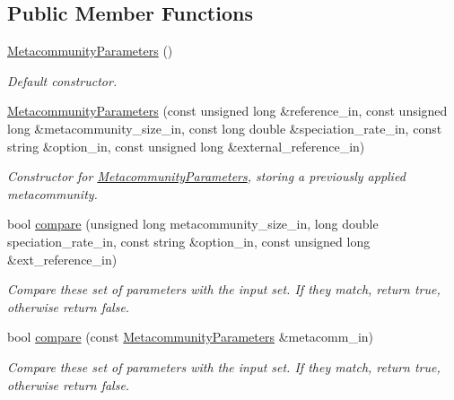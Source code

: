 \subsection*{Public Member Functions}
\begin{DoxyCompactItemize}
\item 
\hyperlink{struct_metacommunity_parameters_a32d0649a8da47daab2a0743e2febf6ca}{Metacommunity\+Parameters} ()\hypertarget{struct_metacommunity_parameters_a32d0649a8da47daab2a0743e2febf6ca}{}\label{struct_metacommunity_parameters_a32d0649a8da47daab2a0743e2febf6ca}

\begin{DoxyCompactList}\small\item\em Default constructor. \end{DoxyCompactList}\item 
\hyperlink{struct_metacommunity_parameters_a104b77bbfa104aac5eaa6f45292cac7c}{Metacommunity\+Parameters} (const unsigned long \&reference\+\_\+in, const unsigned long \&metacommunity\+\_\+size\+\_\+in, const long double \&speciation\+\_\+rate\+\_\+in, const string \&option\+\_\+in, const unsigned long \&external\+\_\+reference\+\_\+in)
\begin{DoxyCompactList}\small\item\em Constructor for \hyperlink{struct_metacommunity_parameters}{Metacommunity\+Parameters}, storing a previously applied metacommunity. \end{DoxyCompactList}\item 
bool \hyperlink{struct_metacommunity_parameters_a92e6d9292308fdd5aeceda97c20554ab}{compare} (unsigned long metacommunity\+\_\+size\+\_\+in, long double speciation\+\_\+rate\+\_\+in, const string \&option\+\_\+in, const unsigned long \&ext\+\_\+reference\+\_\+in)
\begin{DoxyCompactList}\small\item\em Compare these set of parameters with the input set. If they match, return true, otherwise return false. \end{DoxyCompactList}\item 
bool \hyperlink{struct_metacommunity_parameters_a9aaabd56315e4efa98466eb7ddecab06}{compare} (const \hyperlink{struct_metacommunity_parameters}{Metacommunity\+Parameters} \&metacomm\+\_\+in)
\begin{DoxyCompactList}\small\item\em Compare these set of parameters with the input set. If they match, return true, otherwise return false. \end{DoxyCompactList}\item 

\end{DoxyCompactItemize}
